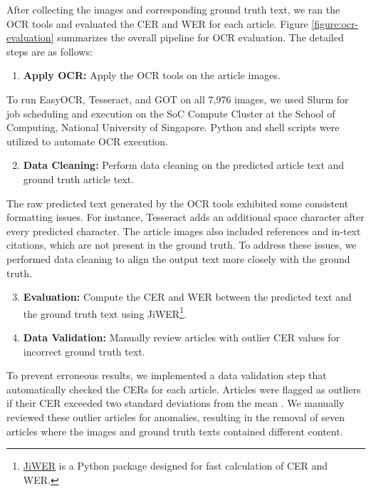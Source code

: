 \documentclass[12pt,oneside]{memoir}
\begin{document}
After collecting the images and corresponding ground truth text, we ran the OCR tools and evaluated the CER and WER for each article.
Figure \ref{figure:ocr-evaluation} summarizes the overall pipeline for OCR evaluation. The detailed steps are as follows:

\begin{enumerate}
    \item \textbf{Apply OCR:} Apply the OCR tools on the article images.
\end{enumerate}

To run EasyOCR, Tesseract, and GOT on all 7,976 images, we used Slurm for job scheduling and execution on the SoC Compute Cluster at the School of Computing, National University of Singapore. Python and shell scripts were utilized to automate OCR execution.

\begin{enumerate}
    \setcounter{enumi}{1}
    \item \textbf{Data Cleaning:} Perform data cleaning on the predicted article text and ground truth article text.
\end{enumerate}

The raw predicted text generated by the OCR tools exhibited some consistent formatting issues.
For instance, Tesseract adds an additional space character after every predicted character.
The article images also included references and in-text citations, which are not present in the ground truth.
To address these issues, we performed data cleaning to align the output text more closely with the ground truth.

\begin{enumerate}
    \setcounter{enumi}{2}
    \item \textbf{Evaluation:} Compute the CER and WER between the predicted text and the ground truth text using JiWER\footnote{\href{https://pypi.org/project/jiwer/}{JiWER} is a Python package designed for fast calculation of CER and WER.}.
    \item \textbf{Data Validation:} Manually review articles with outlier CER values for incorrect ground truth text.
\end{enumerate}

To prevent erroneous results, we implemented a data validation step that automatically checked the CERs for each article.
Articles were flagged as outliers if their CER exceeded two standard deviations from the mean \parencite{cousineau-and-chartier-2010}. 
We manually reviewed these outlier articles for anomalies, resulting in the removal 
of seven articles where the images and ground truth texts contained different content.
\end{document}
